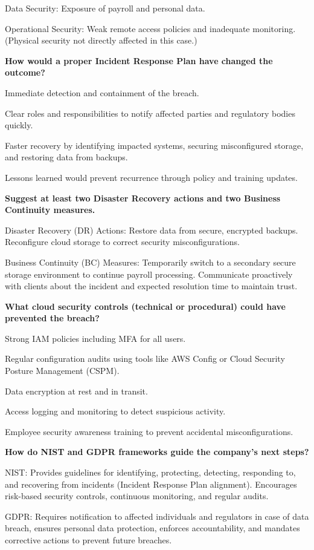 Data Security: Exposure of payroll and personal data.

Operational Security: Weak remote access policies and inadequate monitoring. (Physical security not directly affected in this case.)

\bigskip

\noindent\textbf{How would a proper Incident Response Plan have changed the outcome?}

Immediate detection and containment of the breach.

Clear roles and responsibilities to notify affected parties and regulatory bodies quickly.

Faster recovery by identifying impacted systems, securing misconfigured storage, and restoring data from backups.

Lessons learned would prevent recurrence through policy and training updates.

\bigskip

\noindent\textbf{Suggest at least two Disaster Recovery actions and two Business Continuity measures.}

Disaster Recovery (DR) Actions: Restore data from secure, encrypted backups. Reconfigure cloud storage to correct security misconfigurations.

Business Continuity (BC) Measures: Temporarily switch to a secondary secure storage environment to continue payroll processing. Communicate proactively with clients about the incident and expected resolution time to maintain trust.

\bigskip

\noindent\textbf{What cloud security controls (technical or procedural) could have prevented the breach?}

Strong IAM policies including MFA for all users.

Regular configuration audits using tools like AWS Config or Cloud Security Posture Management (CSPM).

Data encryption at rest and in transit.

Access logging and monitoring to detect suspicious activity.

Employee security awareness training to prevent accidental misconfigurations.

\bigskip

\noindent\textbf{How do NIST and GDPR frameworks guide the company’s next steps?}

NIST: Provides guidelines for identifying, protecting, detecting, responding to, and recovering from incidents (Incident Response Plan alignment). Encourages risk-based security controls, continuous monitoring, and regular audits.

GDPR: Requires notification to affected individuals and regulators in case of data breach, ensures personal data protection, enforces accountability, and mandates corrective actions to prevent future breaches.